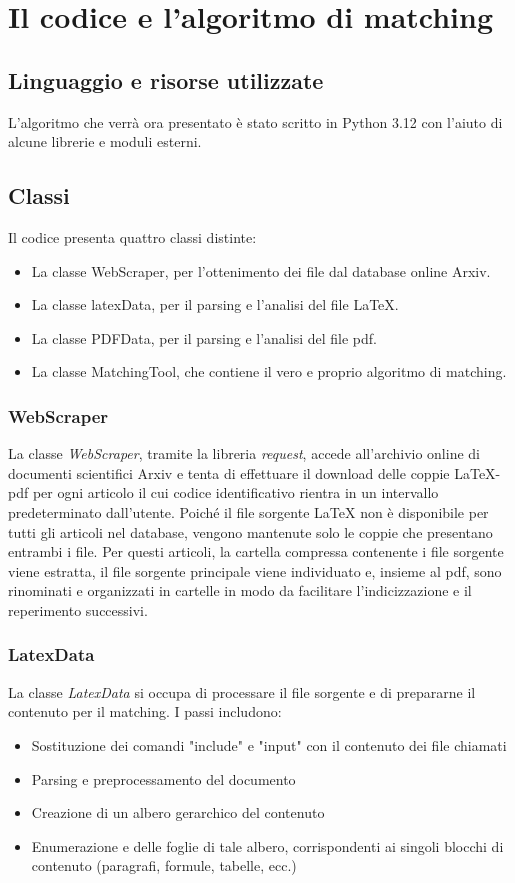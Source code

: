\chapter{Il codice e l'algoritmo di matching}

\section{Linguaggio e risorse utilizzate}
	L'algoritmo che verrà ora presentato è stato scritto in Python 3.12 con l'aiuto di alcune librerie e moduli esterni.

\section{Classi}
	Il codice presenta quattro classi distinte:
	\begin{itemize}
		\item La classe WebScraper, per l'ottenimento dei file dal database online Arxiv.
		\item La classe latexData, per il parsing e l'analisi del file LaTeX.
		\item La classe PDFData, per il parsing e l'analisi del file pdf.
		\item La classe MatchingTool, che contiene il vero e proprio algoritmo di matching.
	\end{itemize}

	\subsection{WebScraper}
		La classe \textit{WebScraper}, tramite la libreria \textit{request}, accede all'archivio online di documenti scientifici Arxiv e tenta
		di effettuare il download delle coppie LaTeX-pdf per ogni articolo il cui codice identificativo rientra in un intervallo
		predeterminato dall'utente.
		Poiché il file sorgente LaTeX non è disponibile per tutti gli articoli nel database, vengono mantenute solo le 
		coppie che presentano entrambi i file. Per questi articoli, la cartella compressa contenente i file sorgente viene 
		estratta, il file sorgente principale viene individuato e, insieme al pdf, sono rinominati e organizzati in cartelle
		in modo da facilitare l'indicizzazione e il reperimento successivi.

	\subsection{LatexData}
		La classe \textit{LatexData} si occupa di processare il file sorgente e di prepararne il contenuto
		per il matching. I passi includono:
		\begin{itemize}
			\item Sostituzione dei comandi "include" e "input" con il contenuto dei file chiamati
			\item Parsing e preprocessamento del documento
			\item Creazione di un albero gerarchico del contenuto
			\item Enumerazione e delle foglie di tale albero, corrispondenti ai singoli blocchi di contenuto (paragrafi, formule, tabelle, ecc.)
		\end{itemize}

